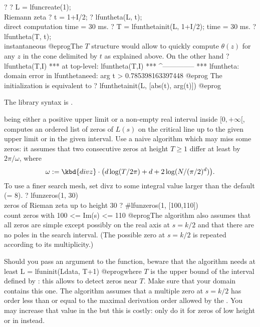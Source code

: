 \bprog
? 
? L = lfuncreate(1); \\ Riemann zeta
? t = 1+I/2;
? lfuntheta(L, t); \\ direct computation
time = 30 ms.
? T = lfunthetainit(L, 1+I/2);
time = 30 ms.
? lfuntheta(T, t); \\ instantaneous
@eprog\noindent The $T$ structure would allow to quickly compute $\theta(z)$
for any $z$ in the cone delimited by $t$ as explained above. On the other hand
\bprog
? lfuntheta(T,I)
 ***   at top-level: lfuntheta(T,I)
 ***                 ^--------------
 *** lfuntheta: domain error in lfunthetaneed: arg t > 0.785398163397448
@eprog
The initialization is equivalent to
\bprog
? lfunthetainit(L, [abs(t), arg(t)])
@eprog

The library syntax is .

\label{se:lfunzeros}
 being either a positive upper limit or a non-empty real
interval inside $[0,+\infty[$, computes an
ordered list of zeros of $L(s)$ on the critical line up to the given
upper limit or in the given interval. Use a naive algorithm which may miss
some zeros: it assumes that two consecutive zeros at height $T \geq 1$
differ at least by $2\pi/\omega$, where
$$\omega := \kbd{divz} \cdot \big(d\log(T/2\pi) +d+ 2\log(N/(\pi/2)^d)\big).$$
To use a finer search mesh, set divz to some integral value
larger than the default (= 8).
\bprog
? lfunzeros(1, 30) \\ zeros of Rieman zeta up to height 30
? #lfunzeros(1, [100,110])  \\ count zeros with 100 <= Im(s) <= 110
@eprog\noindent The algorithm also assumes that all zeros are simple except
possibly on the real axis at $s = k/2$ and that there are no poles in the
search interval. (The possible zero at $s = k/2$ is repeated according to
its multiplicity.)

Should you pass an  argument to the function, beware that the
algorithm needs at least
\bprog
   L = lfuninit(Ldata, T+1)
@eprog\noindent where $T$ is the upper bound of the interval defined by
: this allows to detect zeros near $T$. Make sure that your
 domain contains this one. The algorithm assumes
that a multiple zero at $s = k / 2$ has order less than or equal to
the maximal derivation order allowed by the . You may increase
that value in the  but this is costly: only do it for zeros
of low height or in  instead.

